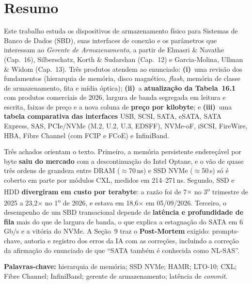 \documentclass[11pt,a4paper]{article}
\newcommand{\us}{\,\textmu s}
\begin{document}
\thispagestyle{empty}
\section*{Resumo}

Este trabalho estuda os dispositivos de armazenamento físico para Sistemas de Banco de Dados
(SBD), suas interfaces de conexão e os parâmetros que interessam ao \emph{Gerente de
Armazenamento}, a partir de Elmasri \& Navathe (Cap.~16), Silberschatz, Korth \& Sudarshan
(Cap.~12) e Garcia-Molina, Ullman \& Widom (Cap.~13). Três produtos atendem ao enunciado:
\textbf{(i)}~uma revisão dos fundamentos (hierarquia de memória, disco magnético, \emph{flash},
memória de classe de armazenamento, fita e mídia óptica); \textbf{(ii)}~a \textbf{atualização
da Tabela~16.1} com produtos comerciais de 2026, largura de banda segregada em leitura e
escrita, faixas de preço e a nova coluna de \textbf{preço por kilobyte}; e \textbf{(iii)}~uma
\textbf{tabela comparativa das interfaces} USB, SCSI, SATA, eSATA, SATA Express, SAS,
PCIe/NVMe (M.2, U.2, U.3, EDSFF), NVMe-oF, iSCSI, FireWire, HBA, Fibre Channel (com FCIP e
FCoE) e InfiniBand.

Três achados orientam o texto. Primeiro, a memória persistente endereçável por byte
\textbf{saiu do mercado} com a descontinuação do Intel Optane, e o vão de quase três ordens
de grandeza entre DRAM ($\approx$70\,ns) e SSD NVMe ($\approx$50\us) só é coberto em parte por
módulos CXL, medidos em 214--271\,ns. Segundo, SSD e HDD \textbf{divergiram em custo por
terabyte}: a razão foi de 7$\times$ no 3\textsuperscript{o} trimestre de 2025 a 23,2$\times$
no 1\textsuperscript{o} de 2026, e estava em 18,6$\times$ em 05/09/2026. Terceiro, o
desempenho de um SBD transacional depende de \textbf{latência e profundidade de fila} mais
do que de largura de banda, o que explica a estagnação do SATA em 6\,Gb/s e a vitória do
NVMe. A Seção~9 traz o \textbf{Post-Mortem} exigido: prompts-chave, autoria e registro dos
erros da IA com as correções, incluindo a correção da afirmação do enunciado de que ``SATA
também é conhecida como NL-SAS''.

\vspace{0.4cm}
\textbf{Palavras-chave:} hierarquia de memória; SSD NVMe; HAMR; LTO-10; CXL; Fibre Channel;
InfiniBand; gerente de armazenamento; latência de \emph{commit}.

\newpage
\thispagestyle{empty}
{\small\setlength{\parskip}{0pt}\tableofcontents}
\newpage
\setcounter{page}{1}
\end{document}
